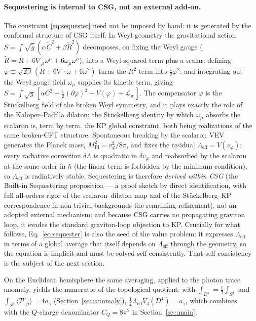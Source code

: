 \documentclass[11pt,a4paper]{article}
\theoremstyle{plain}
\theoremstyle{definition}
\theoremstyle{remark}
\newcommand{\ag}{a_\gamma}
\newcommand{\CQ}{C_Q}
\newcommand{\Mpl}{M_{\mathrm{Pl}}}
\newcommand{\avg}[1]{\langle #1 \rangle}
\begin{document}
\paragraph{Sequestering is internal to CSG, not an external add-on.} The constraint
\eqref{eq:sequester} need not be imposed by hand: it is generated by the conformal structure of
CSG itself. In Weyl geometry the gravitational action $S=\int\sqrt{\tilde g}\,(\alpha\tilde C^2 +
\beta\tilde R^2)$ decomposes, on fixing the Weyl gauge ($\tilde R = R + 6\nabla_\mu\omega^\mu +
6\omega_\mu\omega^\mu$), into a Weyl-squared term plus a scalar: defining
$\varphi \equiv \sqrt{2\beta}\,(R + 6\nabla\!\cdot\!\omega + 6\omega^2)$ turns the $R^2$ term into
$\tfrac12\varphi^2$, and integrating out the Weyl gauge field $\omega_\mu$ supplies its kinetic
term, giving $S=\int\sqrt g\,[\alpha C^2 + \tfrac12(\partial\varphi)^2 - V(\varphi) +
\mathcal{L}_{\mathrm{m}}]$. The compensator $\varphi$ is the Stückelberg field of the broken Weyl
symmetry, and it plays exactly the role of the Kaloper--Padilla dilaton: the Stückelberg
identity by which $\omega_\mu$ absorbs the scalaron is, term by term, the KP global constraint,
both being realizations of the same broken-CFT structure. Spontaneous breaking by the scalaron
VEV generates the Planck mass, $\Mpl^2 = v_\varphi^2/8\pi$, and fixes the residual
$\Lambda_{\mathrm{eff}} = V(v_\varphi)$; every radiative correction $\delta\Lambda$ is quadratic
in $\delta v_\varphi$ and reabsorbed by the scalaron at the same order in $\hbar$ (the linear
term is forbidden by the minimum condition), so $\Lambda_{\mathrm{eff}}$ is radiatively stable.
Sequestering is therefore \emph{derived within CSG} (the Built-in Sequestering proposition --- a
proof sketch by direct identification, with full all-orders rigor of the scalaron--dilaton map
and of the St\"uckelberg--KP correspondence in non-trivial backgrounds the remaining refinement),
not an adopted external mechanism; and because CSG carries no propagating graviton loop, it
evades the standard graviton-loop objection to KP. Crucially for what follows, Eq.~\eqref{eq:sequester} is also the seed of the value
problem: it expresses $\Lambda_{\mathrm{eff}}$ in terms of a global average that itself depends
on $\Lambda_{\mathrm{eff}}$ through the geometry, so the equation is implicit and must be solved
self-consistently. That self-consistency is the subject of the next section.

On the Euclidean hemisphere the same averaging, applied to the photon trace anomaly, yields the
numerator of the topological quotient: with $\int_{D^4} = \tfrac12\int_{S^4}$ and
$\int_{S^4}\avg{T^\mu{}_\mu} = 4\ag$ (Section~\ref{sec:anomaly}),
$\tfrac12\Lambda_{\mathrm{eff}}V_4(D^4) = \ag$, which combines with the $Q$-charge denominator
$\CQ = 8\pi^2$ in Section~\ref{sec:main}.
\end{document}
